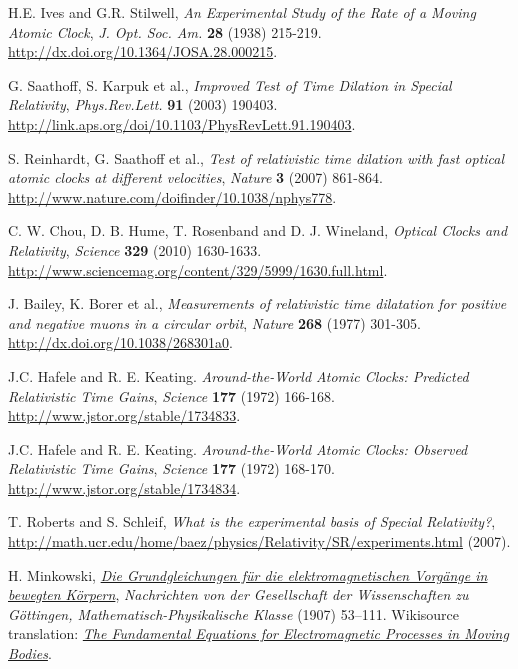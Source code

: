 \begin{thebibliography}{99}
 H.E. Ives and G.R. Stilwell, {\it An Experimental Study of the Rate of a Moving Atomic Clock}, {\sl J. Opt. Soc. Am.} {\bf 28} (1938) 215-219. \url{http://dx.doi.org/10.1364/JOSA.28.000215}.

 G. Saathoff, S. Karpuk et al., {\it Improved Test of Time Dilation in Special Relativity}, {\sl Phys.Rev.Lett.} {\bf 91} (2003) 190403. \url{http://link.aps.org/doi/10.1103/PhysRevLett.91.190403}.

 S. Reinhardt, G. Saathoff et al., {\it Test of relativistic time dilation with fast optical atomic clocks at different velocities}, {\sl Nature} {\bf 3} (2007) 861-864. \url{http://www.nature.com/doifinder/10.1038/nphys778}.

 C. W. Chou, D. B. Hume, T. Rosenband and D. J. Wineland, {\em Optical Clocks and Relativity}, {\sl Science} {\bf 329} (2010) 1630-1633. \url{http://www.sciencemag.org/content/329/5999/1630.full.html}.

 J. Bailey, K. Borer et al., {\it Measurements of relativistic time dilatation for positive and negative muons in a circular orbit}, {\sl Nature} {\bf 268} (1977) 301-305. \url{http://dx.doi.org/10.1038/268301a0}.

 J.C. Hafele and R. E. Keating. {\it Around-the-World Atomic Clocks: Predicted Relativistic Time Gains}, {\sl Science} {\bf 177} (1972) 166-168. \url{http://www.jstor.org/stable/1734833}.

 J.C. Hafele and R. E. Keating. {\it Around-the-World Atomic Clocks: Observed Relativistic Time Gains}, {\sl Science} {\bf 177} (1972) 168-170. \url{http://www.jstor.org/stable/1734834}.

 T. Roberts and S. Schleif, {\it What is the experimental basis of Special Relativity?},  \url{http://math.ucr.edu/home/baez/physics/Relativity/SR/experiments.html} (2007).

 H. Minkowski, \href{http://de.wikisource.org/wiki/Die_Grundgleichungen_f\%C3\%BCr_die_elektromagnetischen_Vorg\%C3\%A4nge_in_bewegten_K\%C3\%B6rpern}{\it Die Grundgleichungen f\"ur die elektromagnetischen Vorg\"ange in bewegten K\"orpern}, {\sl Nachrichten von der Gesellschaft der Wissenschaften zu Göttingen, Mathematisch-Physikalische Klasse} (1907) 53–111. Wikisource translation: \href{http://en.wikisource.org/wiki/The_Fundamental_Equations_for_Electromagnetic_Processes_in_Moving_Bodies}{\it The Fundamental Equations for Electromagnetic Processes in Moving Bodies}.


\end{thebibliography}
